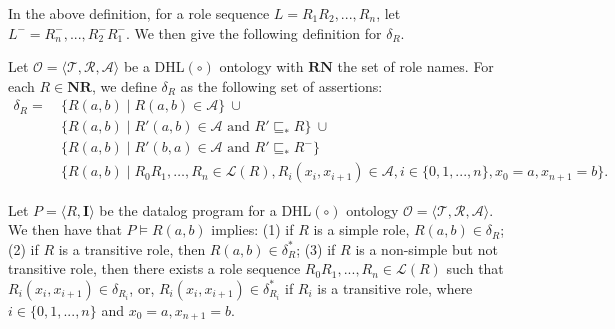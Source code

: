 In the above definition, for a role sequence $L=R_1R_2,...,R_n$, let $L^-=R_n^-,...,R_2^-R_1^-$.
We then give the following definition for $\delta_R$.

\begin{definition}\label{def:deltaRdhlplus}
Let $\mathcal{O}=\langle\mathcal{T},\mathcal{R},\mathcal{A}\rangle$ be
a DHL$(\circ)$ ontology with $\textbf{RN}$ the set of role names. For each
$R\in\textbf{NR}$, we define $\delta_R$ as the following set of assertions:
\begin{align*}
\delta_R =\ & \{ R(a,b) \mid R(a,b) \in\mathcal{A} \}\ \cup\\
& \{ R(a,b) \mid R'(a,b)\in\mathcal{A} \text{ and } R' \sqsubseteq_{*}
  R \}\ \cup\\
& \{ R(a,b) \mid R'(b,a)\in\mathcal{A} \text{ and } R'\sqsubseteq_{*}
  R^- \}\\
& \{ R(a,b) \mid R_0R_1,\ldots,R_n\in\mathcal{L}(R),
  R_i(x_i,x_{i+1})\in\mathcal{A}, i\in\{0,1,...,n\}, x_0=a, x_{n+1}=b \}.
\end{align*}
\end{definition}

\begin{lemma}\label{lemma:tiplus}
Let
    $P=\langle R, \textbf{I}\rangle$ be the datalog program for a DHL$(\circ)$
    ontology
    $\mathcal{O}=\langle\mathcal{T},\mathcal{R},\mathcal{A}\rangle$. We
  then have that
$P\models R(a,b)$ implies: (1) if $R$ is a simple role, $R(a,b)\in\delta_R$;
(2) if $R$ is a transitive role, then $R(a,b)\in\delta^*_R$;
(3) if $R$ is a non-simple but not transitive role, then there exists a role sequence $R_0R_1,...,R_n\in\mathcal{L}(R)$ such that
$R_i(x_i,x_{i+1})\in\delta_{R_i}$, or, $R_i(x_i,x_{i+1})\in\delta^*_{R_i}$ if $R_i$ is a transitive role,
where $i\in\{0,1,...,n\}$ and $x_0=a, x_{n+1}=b$.
\end{lemma}

